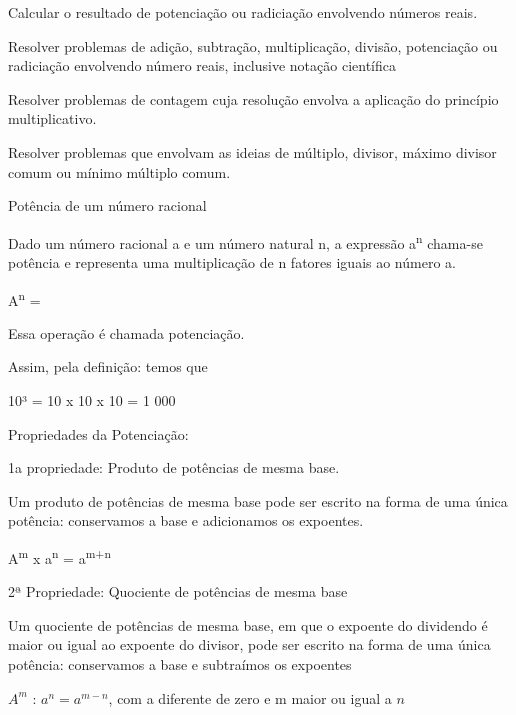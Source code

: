 Calcular o resultado de potenciação ou radiciação envolvendo números
reais.

Resolver problemas de adição, subtração, multiplicação, divisão,
potenciação ou radiciação envolvendo número reais, inclusive notação
científica

Resolver problemas de contagem cuja resolução envolva a aplicação do
princípio multiplicativo.

Resolver problemas que envolvam as ideias de múltiplo, divisor, máximo
divisor comum ou mínimo múltiplo comum.

Potência de um número racional

Dado um número racional a e um número natural n, a expressão
a\textsuperscript{n} chama-se potência e representa uma multiplicação de
n fatores iguais ao número a.

A\textsuperscript{n} =


Essa operação é chamada potenciação.

Assim, pela definição: temos que

10³ = 10 x 10 x 10 = 1 000

Propriedades da Potenciação:

1a propriedade: Produto de potências de mesma base.

Um produto de potências de mesma base pode ser escrito na forma de uma
única potência: conservamos a base e adicionamos os expoentes.

A\textsuperscript{m} x a\textsuperscript{n} = a\textsuperscript{m+n}

2ª Propriedade: Quociente de potências de mesma base

Um quociente de potências de mesma base, em que o expoente do dividendo
é maior ou igual ao expoente do divisor, pode ser escrito na forma de
uma única potência: conservamos a base e subtraímos os expoentes

$A^{m}$ : $a^{n} = a^{m-n}$,
com a diferente de zero e m maior ou igual a $n$

